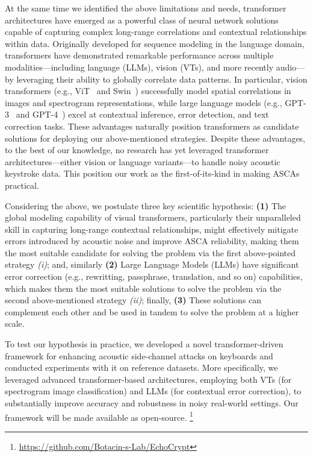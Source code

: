 At the same time we identified the above limitations and needs, transformer architectures have emerged as a powerful class of neural network solutions capable of capturing complex long-range correlations and contextual relationships within data. Originally developed for sequence modeling in the language domain, transformers have demonstrated remarkable performance across multiple modalities—including language (LLMs), vision (VTs), and more recently audio—by leveraging their ability to globally correlate data patterns. In particular, vision transformers (e.g., ViT~\cite{dosovitskiy2020image} and Swin~\cite{liu2021swin}) successfully model spatial correlations in images and spectrogram representations, while large language models (e.g., GPT-3~\cite{brown2020language} and GPT-4~\cite{achiam2023gpt}) excel at contextual inference, error detection, and text correction tasks. These advantages naturally position transformers as candidate solutions for deploying our above-mentioned strategies. Despite these advantages, to the best of our knowledge, no research has yet leveraged transformer architectures—either vision or language variants—to handle noisy acoustic keystroke data. This position our work as the first-of-its-kind in making ASCAs practical.

Considering the above, we postulate three key scientific hypothesis: \textbf{(1)} The global modeling capability of visual transformers, particularly their unparalleled skill in capturing long-range contextual relationships, might effectively mitigate errors introduced by acoustic noise and improve ASCA reliability, making them the most suitable candidate for solving the problem via the first above-pointed strategy \textit{(i)}; and, similarly \textbf{(2)} Large Language Models (LLMs) have significant error correction (e.g., rewritting, passphrase, translation, and so on) capabilities, which makes them the most suitable solutions to solve the problem via the second above-mentioned strategy \textit{(ii)}; finally, \textbf{(3)} These solutions can complement each other and be used in tandem to solve the problem at a higher scale.

To test our hypothesis in practice, we developed a novel transformer-driven framework for enhancing acoustic side-channel attacks on keyboards and conducted experiments with it on reference datasets. More specifically, we leveraged advanced transformer-based architectures, employing both VTs (for spectrogram image classification) and LLMs (for contextual error correction), to substantially improve accuracy and robustness in noisy real-world settings. Our framework will be made available as open-source. \footnote{\url{https://github.com/Botacin-s-Lab/EchoCrypt}}

